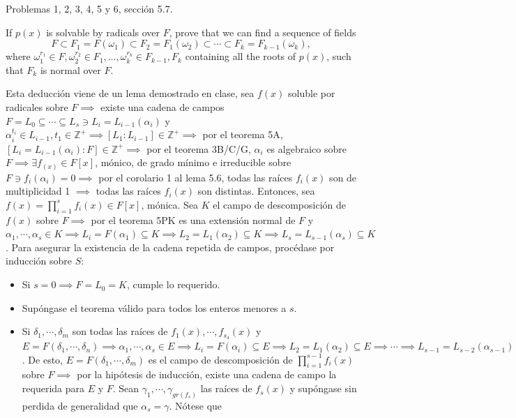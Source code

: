 




Problemas 1, 2, 3, 4, 5 y 6, sección 5.7.


\begin{problema}[Problema 1]
    If $p(x)$ is solvable by radicals over $F$, prove that we can find a sequence of fields
    $$
    F \subset F_1=F\left(\omega_1\right) \subset F_2=F_1\left(\omega_2\right) \subset \cdots \subset F_k=F_{k-1}\left(\omega_k\right),
    $$
    where $\omega_1^{r_1} \in F, \omega_2^{r_2} \in F_1, \ldots, \omega_k^{r_k} \in F_{k-1}, F_k$ containing all the roots of $p(x)$, such that $F_k$ is normal over $F$.
    \begin{dem}
        Esta deducción viene de un lema demostrado en clase, sea $f(x)$ soluble por radicales sobre $F\implies$ existe una cadena de campos $F=L_0\subseteq \cdots\subseteq L_s\ni L_i=L_{i-1}(\alpha_i)$ y $\alpha_i^{t_i}\in L_{i-1},t_1\in \mathbb{Z}^+\implies [L_1:L_{i-1}]\in \mathbb{Z}^+\implies$ por el teorema 5A, $[L_i=L_{i-1}(\alpha_i):F]\in\mathbb{Z}^+\implies$ por el teorema 3B/C/G, $\alpha_i$ es algebraico sobre $F\implies \exists f_(x)\in F[x]$, mónico, de grado mínimo e irreducible sobre $F\ni f_i(\alpha_i)=0\implies$ por el corolario 1 al lema 5.6, todas las raíces $f_i(x)$ son de multiplicidad 1 $\implies$ todas las raíces $f_i(x)$ son distintas. Entonces, sea $f(x)=\prod_{i=1}^sf_i(x)\in F[x]$, mónica. Sea $K$ el campo de descomposición de $f(x)$ sobre $F\implies$ por el teorema 5PK es una extensión normal de $F$ y $\alpha_1,\cdots,\alpha_s\in K\implies L_i=F(\alpha_1)\subseteq K\implies L_2=L_1(\alpha_2)\subseteq K\implies L_s=L_{s-1}(\alpha_s)\subseteq K$. Para asegurar la existencia de la cadena repetida de campos, procédase por inducción sobre $S$:
        \begin{itemize}
            \item Si $s=0\implies F=L_0=K$, cumple lo requerido. 
            \item Supóngase el teorema válido para todos los enteros menores a $s$. 
            \item Si $\delta_1,\cdots,\delta_m$ son todas las raíces de $f_1(x),\cdots,f_{s_4}(x)$ y $E=F(\delta_1,\cdots,\delta_n)\implies \alpha_1,\cdots,\alpha_s\in E\implies L_i=F(\alpha_i)\subseteq E\implies L_2=L_1(\alpha_2)\subseteq E\implies\cdots \implies L_{s-1}=L_{s-2}(\alpha_{s-1})\subseteq E$. De esto, $E=F(\delta_1,\cdots,\delta_m)$ es el campo de descomposición de $\prod_{i=1}^{s-1}f_i(x)$ sobre $F\implies$ por la hipótesis de inducción, existe una cadena de campo la requerida para $E$ y $F$. Sean $\gamma_1,\cdots,\gamma_{gr(f_s)}$ las raíces de $f_s(x)$ y supóngase sin perdida de generalidad que $\alpha_s=\gamma$. Nótese que 

\end{itemize}
\end{dem}
\end{problema}
